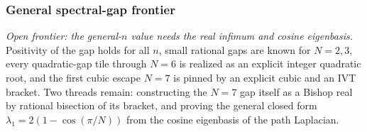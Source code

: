 \subsubsection{General spectral-gap frontier}

\begin{theorem}\label{thm:tile-spectral-gap}\notready{}
\emph{Open frontier: the general-$n$ value needs the real infimum and cosine
eigenbasis.} Positivity of the gap holds for all $n$, small rational gaps are
known for $N=2,3$, every quadratic-gap tile through $N=6$ is realized as an
explicit integer quadratic root, and the first cubic escape $N=7$ is pinned by
an explicit cubic and an IVT bracket. Two threads remain: constructing the
$N=7$ gap itself as a Bishop real by rational bisection of its bracket, and
proving the general closed form
$\lambda_1=2(1-\cos(\pi/N))$ from the cosine eigenbasis of the path Laplacian.
\end{theorem}

